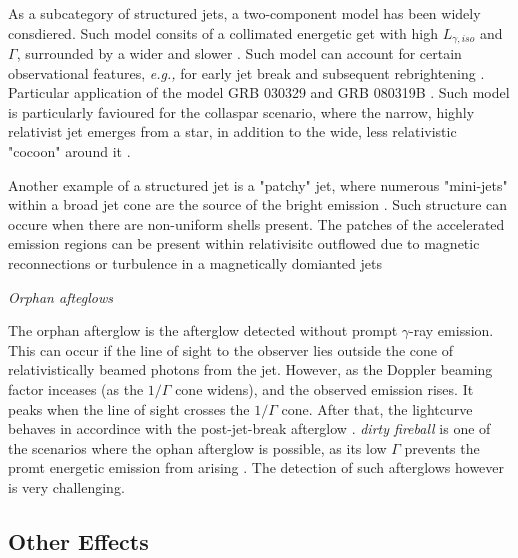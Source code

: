 
As a subcategory of structured jets, a two-component model has been widely consdiered. Such model consits of a collimated energetic get with high $L_{\gamma,iso}$ and $\Gamma$, surrounded by a wider and slower . 
Such model can account for certain observational features, \textit{e.g.,} for early jet break and subsequent rebrightening
\cite{Huang et al., 2004; Peng et al., 2005; Wu et al., 2005}.
Particular application of the model GRB 030329 \cite{(Berger et al., 2003b)} and GRB 080319B \cite{(Racusin et al., 2008).}.
Such model is particularly favioured for the collaspar scenario, where the narrow, highly relativist jet emerges from a star, in addition to the wide, less relativistic "cocoon" around it \cite{Ramirez-Ruiz et al., 2002; Zhang et al., 2004b}. 


Another example of a structured jet is a "patchy" jet, where numerous "mini-jets" within a broad jet cone are the source of the bright emission \cite{Kumar and Piran, 2000a; Yamazaki et al., 2004b}.
Such structure can occure when there are non-uniform shells present.
The patches of the accelerated emission regions can be present within relativisitc outflowed due to magnetic reconnections or turbulence in a magnetically domianted jets \cite{Luticov and Blandford, 2003; Narayan and Kumar, 2009; Kumar and Narayan, 2009; Lazar et al., 2009; Zhang and Yan, 2011; Zhang and Zhang, 2014}


\textit{Orphan afteglows}

The orphan afterglow is the afterglow detected without prompt $\gamma$-ray emission. This can occur if the line of sight to the observer lies outside the cone of relativistically beamed photons from the jet. However, as the Doppler beaming factor inceases (as the $1/\Gamma$ cone widens), and the observed emission rises. It peaks when the line of sight crosses the $1/\Gamma$ cone. After that, the lightcurve behaves in accordince with the post-jet-break afterglow \cite{Granot et al., 2002}.
\textit{dirty fireball} is one of the scenarios where the ophan afterglow is possible, as its low $\Gamma$ prevents the promt energetic emission from arising \cite{Huang et al., 2002).}. 
The detection of such afterglows however is very challenging.


\subsection{Other Effects}

